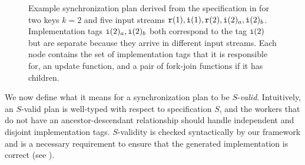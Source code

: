 \begin{figure}
\scalebox{0.8}{
\begin{tikzpicture}[sibling distance=11em,
  every node/.style = {shape=rectangle,
    rounded corners,
    draw, align=center}]]
  \node { \TopConfigNode{$w_1$}{}{update -- $\langle$ fork, join $\rangle$} }
    child { \ConfigurationNode{$w_2$}{$\tg{r}(1), \tg{i}(1)$}{update} }
    child { \ConfigurationNode{$w_3$}{$\tg{r}(2)$}{update -- $\langle$ fork, join $\rangle$}
        child { \ConfigurationNode{$w_4$}{$\tg{i}(2)_a$}{update} }
        child { \ConfigurationNode{$w_5$}{$\tg{i}(2)_b$}{update} } };
\end{tikzpicture}
}
\caption{Example synchronization plan derived from the
  specification in  for two keys $k=2$ and
  five input streams $\texttt{r}(1), \texttt{i}(1), \texttt{r}(2), \texttt{i}(2)_a, \texttt{i}(2)_b$.
  Implementation tags $\texttt{i}(2)_a, \texttt{i}(2)_b$ both correspond to the tag $\texttt{i}(2)$ but are separate because they arrive in different input streams.
  Each node contains the set of implementation tags that it is responsible for,
  an update function, and a pair of fork-join
  functions if it has children.
  }
\label{fig:example-configuration}
\end{figure}


We now define what it means for a synchronization plan to be $S$-\emph{valid}.
Intuitively, an $S$-valid plan is well-typed with respect to specification $S$,
  and the workers that do not have an ancestor-descendant relationship should handle independent and disjoint implementation tags.
$S$-validity is checked syntactically by our framework
  and is a necessary requirement to ensure that the generated implementation is correct (see ).

